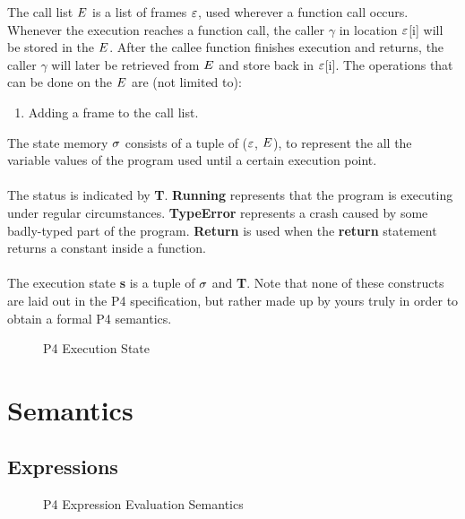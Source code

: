 \documentclass[UTF8]{article}
\begin{document}
The call list $E$ is a list of frames $\varepsilon$, used wherever a function call occurs. Whenever the execution reaches a function call, the caller $\gamma$ in location $\varepsilon$[i] will be stored in the $E$. After the callee function finishes execution and returns, the caller $\gamma$ will later be retrieved from $E$ and store back in $\varepsilon$[i]. The operations that can be done on the $E$ are (not limited to): 
\begin{enumerate}
\item Adding a frame to the call list.
\end{enumerate}

The state memory $\sigma{}$ consists of a tuple of ($\varepsilon$, $E$), to represent the all the variable values of the program used until a certain execution point.
\\~\\
The status is indicated by \textbf{T}. \textbf{Running} represents that the program is executing under regular circumstances. \textbf{TypeError} represents a crash caused by some badly-typed part of the program. \textbf{Return} is used when the \textbf{return} statement returns a constant inside a function.
\\~\\
The execution state \textbf{s} is a tuple of $\sigma{}$ and \textbf{T}. Note that none of these constructs are laid out in the P4 specification, but rather made up by yours truly in order to obtain a formal P4 semantics.
\begin{figure}[h!]
\centering\ottgrammartabular{
\ottstatus\ottinterrule
\ottstate\ottafterlastrule
}
\caption{P4 Execution State}
\label{fig:status}
\end{figure}

\section{Semantics}
\subsection{Expressions}

\begin{figure}[ht!]
\caption{P4 Expression Evaluation Semantics}
\label{fig:semexp}
\end{figure}
\end{document}
